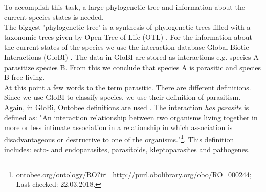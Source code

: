
    To accomplish this task, a large phylogenetic tree and information about the current species states 
      is needed. \\
    The biggest 'phylogenetic tree' is a synthesis of phylogenetic trees filled with a taxonomic trees 
      given by Open Tree of Life (OTL) \cite{Hinchliff2015}. %
    For the information about the current states of the species we use the interaction database Global 
      Biotic Interactions (GloBI) \cite{Poelen2014}. The data in GloBI are stored as interactions e.g. 
      species A parasitize species B. From this we conclude that species A is parasitic and species B 
      free-living. \\

    At this point a few words to the term parasitic. There are different definitions. Since we use 
      GloBI to classify species, we use their definition of parasitism. Again, in GloBi, Ontobee 
      definitions are used \cite{Xiang2011}.
    The interaction \textit{has parasite} is defined as: "An interaction relationship between two 
      organisms living together in more or less intimate association in a relationship in which 
      association is disadvantageous or destructive to one of the organisms."\footnote{
        \hyperlink{http://www.ontobee.org/ontology/RO?iri=http://purl.obolibrary.org/obo/RO_0002445}
        {ontobee.org/ontology/RO?iri=http://purl.obolibrary.org/obo/RO\_000244}; Last checked: 22.03.2018.
      }. This definition includes: ecto- and endoparasites, parasitoids, kleptoparasites and pathogenes.

